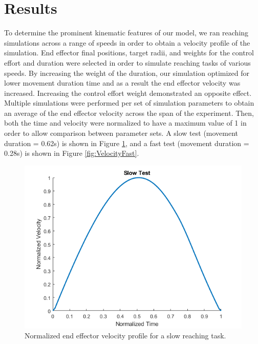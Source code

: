 \documentclass[letterpaper, 10pt, conference]{ieeeconf}
\begin{document}
\section{Results}

To determine the prominent kinematic features of our model, we ran reaching simulations across a range of speeds in order to obtain a velocity profile of the simulation. End effector final positions, target radii, and weights for the control effort and duration were selected in order to simulate reaching tasks of various speeds. By increasing the weight of the duration, our simulation optimized for lower movement duration time and as a result the end effector velocity was increased. Increasing the control effort weight demonstrated an opposite effect. Multiple simulations were performed per set of simulation parameters to obtain an average of the end effector velocity across the span of the experiment. Then, both the time and velocity were normalized to have a maximum value of 1 in order to allow comparison between parameter sets. A slow test (movement duration = 0.62s) is shown in Figure \ref{fig:VelocitySlow}, and a fast test (movement duration = 0.28s) is shown in Figure \ref{fig:VelocityFast}. 

\begin{figure}[h]
    \centering
    \includegraphics[width=1\linewidth]{Normalized Velocity Slow.png}
    \caption{Normalized end effector velocity profile for a slow reaching task.}
    \label{fig:VelocitySlow}
\end{figure}
\end{document}
